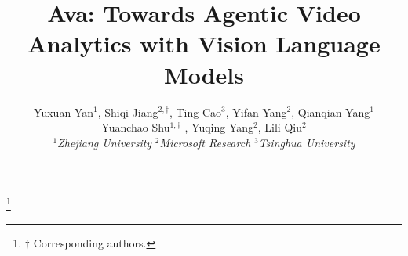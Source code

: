 \documentclass[letterpaper,twocolumn,10pt]{article}
\newcommand{\sysname}[0]{{\sc Ava}\xspace}
\newcommand\blfootnote[1]{%
  \begingroup
  \renewcommand\thefootnote{}\footnote{#1}%
  \addtocounter{footnote}{-1}%
  \endgroup
}
\begin{document}
\title{\sysname: Towards Agentic Video Analytics with Vision Language Models}

\author{\normalfont
Yuxuan Yan$^{1}$,
Shiqi Jiang$^{2,\dagger}$, Ting Cao$^{3}$, Yifan Yang$^{2}$, Qianqian Yang$^{1}$\\\normalfont
Yuanchao Shu$^{1,\dagger}$ , Yuqing Yang$^{2}$, Lili Qiu$^{2}$\\
$^1$\textit{Zhejiang University} \qquad
$^2$\textit{Microsoft Research} \qquad
$^3$\textit{Tsinghua University}
}





\maketitle
\blfootnote{$\dagger$ Corresponding authors.}












\footnotesize



\clearpage

\end{document}
